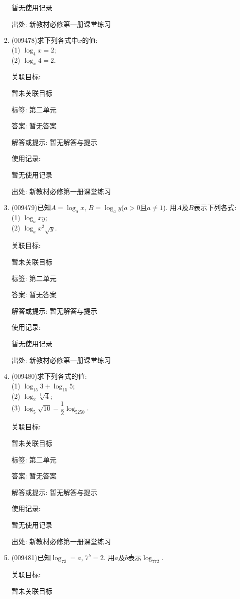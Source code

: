 \documentclass[10pt,a4paper]{article}
\begin{document}
\begin{enumerate}[1.]
暂无使用记录


出处: 新教材必修第一册课堂练习
\item { (009478)}求下列各式中$x$的值:\\
(1) $\log_4x=2$;\\
(2) $\log_x4=2$.


关联目标:

暂未关联目标



标签: 第二单元

答案: 暂无答案

解答或提示: 暂无解答与提示

使用记录:

暂无使用记录


出处: 新教材必修第一册课堂练习
\item { (009479)}已知$A=\log_ax$, $B=\log_ay$($a>0$且$a\ne 1$). 用$A$及$B$表示下列各式:\\
(1) $\log_axy$;\\
(2) $\log_ax^2\sqrt y$.


关联目标:

暂未关联目标



标签: 第二单元

答案: 暂无答案

解答或提示: 暂无解答与提示

使用记录:

暂无使用记录


出处: 新教材必修第一册课堂练习
\item { (009480)}求下列各式的值:\\
(1) $\log_{15}3+\log_{15}5$;\\
(2) $\log_2\sqrt[3]{4}$;\\
(3) $\log_5\sqrt{10}-\dfrac 12\log_5250$.


关联目标:

暂未关联目标



标签: 第二单元

答案: 暂无答案

解答或提示: 暂无解答与提示

使用记录:

暂无使用记录


出处: 新教材必修第一册课堂练习
\item { (009481)}已知$\log_73=a$, $7^b=2$. 用$a$及$b$表示$\log_772$.


关联目标:

暂未关联目标




\end{enumerate}
\end{document}
